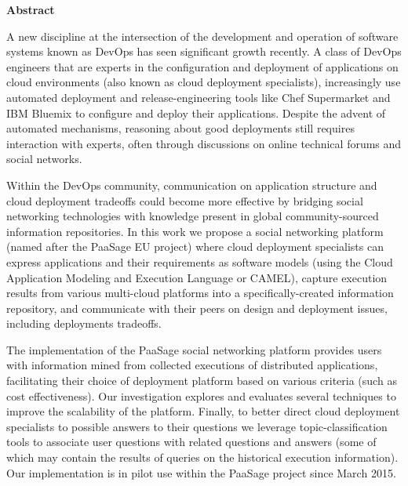 \thispagestyle{empty}
\begin{titlepage}
\begin{center}
{\bf\Large Abstract}\\
\end{center}

\indent A new discipline at the intersection of the development and operation of software systems known as DevOps has seen significant growth recently. A class of DevOps engineers that are experts in the configuration and deployment of applications on cloud environments (also known as cloud deployment specialists), increasingly use automated deployment and release-engineering tools like Chef Supermarket and IBM Bluemix to configure and deploy their applications.  Despite the advent of automated mechanisms, reasoning about good deployments still requires interaction with experts, often through discussions on online technical forums and social networks. 

Within the DevOps community, communication on application structure and cloud deployment tradeoffs could become more effective by bridging social networking technologies with knowledge present in global community-sourced information repositories.  In this work we propose a social networking platform (named after the PaaSage EU project) where cloud deployment specialists can express applications and their requirements as software models (using the Cloud Application Modeling and Execution Language or CAMEL), capture execution results from various multi-cloud platforms into a specifically-created information repository, and communicate with their peers on design and deployment issues, including deployments tradeoffs.

The implementation of the PaaSage social networking platform provides users with information mined from collected executions of distributed applications, facilitating their choice of deployment platform based on various criteria (such as cost effectiveness). Our investigation explores and evaluates several techniques to improve the scalability of the platform.  Finally, to better direct cloud deployment specialists to possible answers to their questions we leverage topic-classification tools to associate user questions with related questions and answers (some of which may contain the results of queries on the historical execution information). Our implementation is in pilot use within the PaaSage project since March 2015.

\vfill
\end{titlepage}

